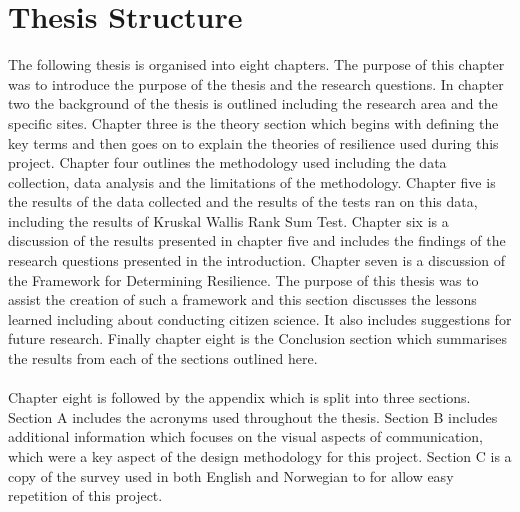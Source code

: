 \section{Thesis Structure}
The following thesis is organised into eight chapters. The purpose of this chapter was to introduce the purpose of the thesis and the research questions. In chapter two the background of the thesis is outlined including the research area and the specific sites. Chapter three is the theory section which begins with defining the key terms and then goes on to explain the theories of resilience used during this project. Chapter four outlines the methodology used including the data collection, data analysis and the limitations of the methodology. Chapter five is the results of the data collected and the results of the tests ran on this data, including the results of Kruskal Wallis Rank Sum Test. Chapter six is a discussion of the results presented in chapter five and includes the findings of the research questions presented in the introduction. Chapter seven is a discussion of the Framework for Determining Resilience. The purpose of this thesis was to assist the creation of such a framework and this section discusses the lessons learned including about conducting citizen science. It also includes suggestions for future research. Finally chapter eight is the Conclusion section which summarises the results from each of the sections outlined here.
\paragraph{}

Chapter eight is followed by the appendix which is split into three sections. Section A includes the acronyms used throughout the thesis. Section B includes additional information which focuses on the visual aspects of communication, which were a key aspect of the design methodology for this project. Section C is a copy of the survey used in both English and Norwegian to for allow easy repetition of this project. 
